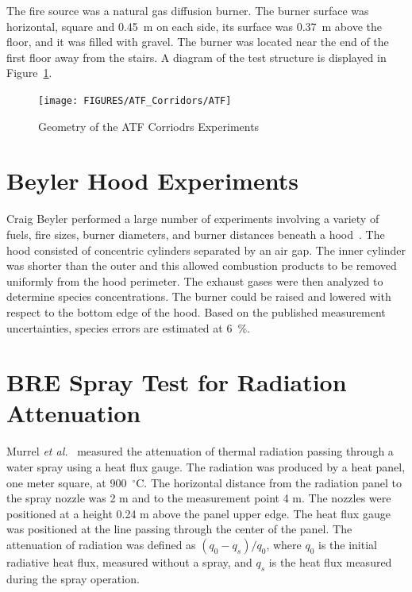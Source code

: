 The fire source was a natural gas diffusion burner.  The burner surface was horizontal, square and 0.45~m on each side, its surface was 0.37~m above the floor, and it was filled with gravel.  The burner was located near the end of the first floor away from the stairs. A diagram of the test structure is displayed in Figure~\ref{ATF Drawing}.


\begin{figure}
\begin{center}
\texttt{[image: FIGURES/ATF\_Corridors/ATF]}
\end{center}
\caption{Geometry of the ATF Corriodrs Experiments}
\label{ATF Drawing}
\end{figure}

\clearpage



\section{Beyler Hood Experiments}

Craig Beyler performed a large number of experiments involving a variety of fuels, fire sizes, burner diameters, and
burner distances beneath a hood~\cite{Beyler:Hood}.  The hood consisted of concentric cylinders separated
by an air gap.  The inner cylinder was shorter than the outer and this allowed combustion products to be removed
uniformly from the hood perimeter.  The exhaust gases were then analyzed to determine species concentrations.
The burner could be raised and lowered with respect to the bottom edge of the hood.  Based on the published
measurement uncertainties, species errors are estimated at 6~\%.



\section{BRE Spray Test for Radiation Attenuation}

Murrel {\em et al.}~\cite{Murrel:1995} measured the attenuation of thermal radiation passing through a water
spray using a heat flux gauge. The radiation was produced by a heat panel, one meter square, at 900~$^\circ$C. The horizontal distance
from the radiation panel to the spray nozzle was 2 m and to the measurement point 4 m. The nozzles were positioned at
a height 0.24 m above the panel upper edge. The heat flux gauge was positioned at the line passing through the center
of the panel. The attenuation of radiation was defined as $(q_0-q_s)/q_0$, where $q_0$ is the initial radiative heat flux,
measured without a spray, and $q_s$ is the heat flux measured during the spray operation.

